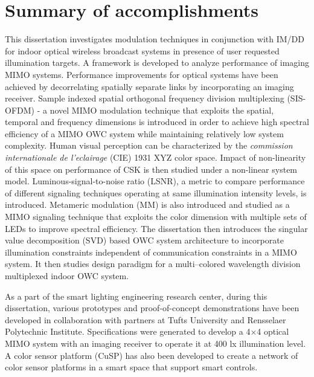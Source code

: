 \section{Summary of accomplishments}
\label{sec:accomplishments}
\graphicspath{{_Intro/Figures/}}

This dissertation investigates modulation techniques in conjunction with IM/DD for indoor optical wireless broadcast systems in presence of user requested illumination targets. A framework is developed to analyze performance of imaging MIMO systems. Performance improvements for optical systems have been achieved by decorrelating spatially separate links by incorporating an imaging receiver. Sample indexed spatial orthogonal frequency division multiplexing (SIS-OFDM) - a novel MIMO modulation technique that exploits the spatial, temporal and frequency dimensions is introduced in order to achieve high spectral efficiency of a MIMO OWC system while maintaining relatively low system complexity. Human visual perception can be characterized by the \textit{commission internationale de l'eclairage} (CIE) 1931 XYZ color space. Impact of non-linearity of this space on performance of CSK is then studied under a non-linear system model. Luminous-signal-to-noise ratio (LSNR), a metric to compare performance of different signaling techniques operating at same illumination intensity levels, is introduced. Metameric modulation (MM) is also introduced and studied as a MIMO signaling technique that exploits the color dimension with multiple sets of LEDs to improve spectral efficiency. The dissertation then introduces the singular value decomposition (SVD) based OWC system architecture to incorporate illumination constraints independent of communication constraints in a MIMO system. It then studies design paradigm for a multi--colored wavelength division multiplexed indoor OWC system. 

As a part of the smart lighting engineering research center, during this dissertation, various prototypes and proof-of-concept demonstrations have been developed in collaboration with partners at Tufts University and Rensselaer Polytechnic Institute. Specifications were generated to develop a 4$\times$4 optical MIMO system with an imaging receiver to operate it at 400 lx illumination level. A color sensor platform (CuSP) has also been developed to create a network of color sensor platforms in a smart space that support smart controls.